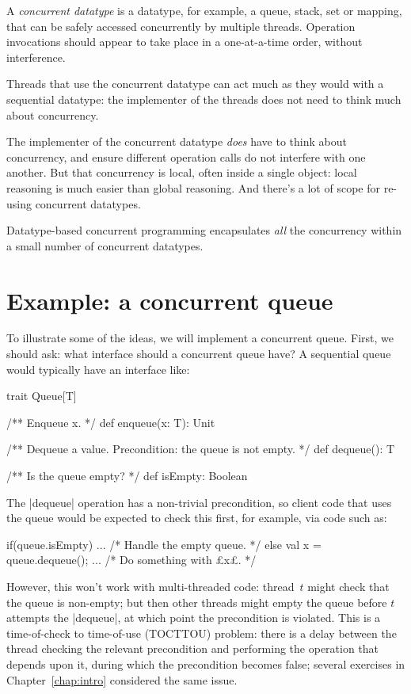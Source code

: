 A \emph{concurrent datatype} is a datatype, for example, a queue, stack, set
or mapping, that can be safely accessed concurrently by multiple threads.
Operation invocations should appear to take place in a one-at-a-time order,
without interference.

Threads that use the concurrent datatype can act much as they would with a
sequential datatype: the implementer of the threads does not need to think
much about concurrency.  

The implementer of the concurrent datatype \emph{does} have to think about
concurrency, and ensure different operation calls do not interfere with one
another.  But that concurrency is local, often inside a single object: local
reasoning is much easier than global reasoning.  And there's a lot of scope
for re-using concurrent datatypes.

Datatype-based concurrent programming encapsulates \emph{all} the concurrency
within a small number of concurrent datatypes.


\section{Example: a concurrent queue}
\label{sec:total-queue}

To illustrate some of the ideas, we will implement a concurrent queue.  First,
we should ask: what interface should a concurrent queue have?  A sequential
queue would typically have an interface like:
%
\begin{mysamepage}
\begin{scala}
trait Queue[T]{
  /** Enqueue x. */
  def enqueue(x: T): Unit

  /** Dequeue a value.  Precondition: the queue is not empty. */
  def dequeue(): T

  /** Is the queue empty? */
  def isEmpty: Boolean
}
\end{scala}
\end{mysamepage}
%
The |dequeue| operation has a non-trivial precondition, so client code that
uses the queue would be expected to check this first, for example, via code
such as:
\begin{scala}
  if(queue.isEmpty){ ... /* Handle the empty queue. */ } 
  else{ val x = queue.dequeue(); ... /* Do something with £x£. */ }
\end{scala}

However, this won't work with multi-threaded code: thread~$t$ might check that
the queue is non-empty; but then other threads might empty the queue before
$t$ attempts the |dequeue|, at which point the precondition is violated.  This
is a time-of-check to time-of-use (TOCTTOU) problem: there is a delay between
the thread checking the relevant precondition and performing the operation that
depends upon it, during  which the precondition becomes false; several
exercises in Chapter~\ref{chap:intro} considered the same issue.

